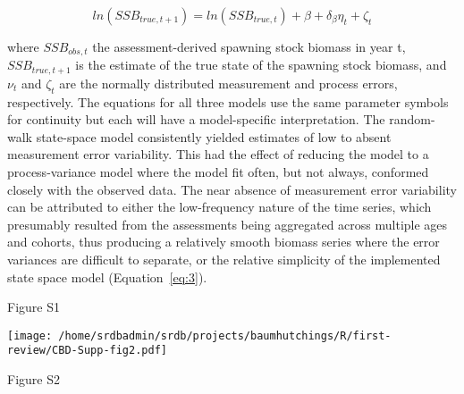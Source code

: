 \documentclass[letterpaper,12pt]{article}
\begin{document}
\begin{equation}
ln\left(SSB_{true,t+1}\right) = ln\left(SSB_{true,t}\right) + \beta + \delta_{\beta}\eta_{t} + \zeta_{t}
\label{eq:3}
\end{equation}

where $SSB_{obs,t}$ the assessment-derived spawning stock biomass in year t, $SSB_{true,t+1}$ is
the estimate of the true state of the spawning stock biomass, and $\nu_{t}$
and $\zeta_{t}$ are the normally distributed measurement and process errors,
respectively. The equations for all three models use the same
parameter symbols for continuity but each will have a model-specific
interpretation. The random-walk state-space model consistently yielded
estimates of low to absent measurement error variability. This had the
effect of reducing the model to a process-variance model where the
model fit often, but not always, conformed closely with the observed
data. The near absence of measurement error variability can be
attributed to either the low-frequency nature of the time series,
which presumably resulted from the assessments being aggregated across
multiple ages and cohorts, thus producing a relatively smooth biomass
series where the error variances are difficult to separate, or the
relative simplicity of the implemented state space model (Equation~\ref{eq:3}).


\clearpage

\begin{tiny}
\begin{landscape}

\end{landscape}
\end{tiny}

\clearpage


\noindent 
Figure S1

\clearpage

\begin{center}
\texttt{[image: /home/srdbadmin/srdb/projects/baumhutchings/R/first-review/CBD-Supp-fig2.pdf]}
\end{center}
\noindent 
Figure S2
\end{document}
